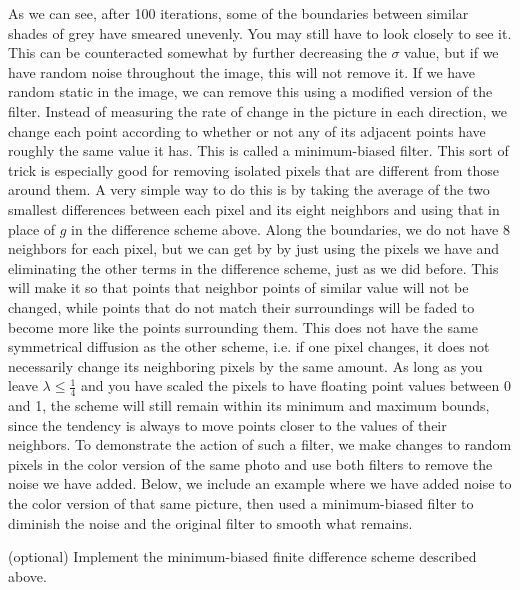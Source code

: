 As we can see, after 100 iterations, some of the boundaries between similar shades of grey have smeared unevenly. You may still have to look closely to see it.
This can be counteracted somewhat by further decreasing the $\sigma$ value, but if we have random noise throughout the image, this will not remove it.
If we have random static in the image, we can remove this using a modified version of the filter.
Instead of measuring the rate of change in the picture in each direction, we change each point according to whether or not any of its adjacent points have roughly the same value it has. 
This is called a minimum-biased filter. 
This sort of trick is especially good for removing isolated pixels that are different from those around them.
A very simple way to do this is by taking the average of the two smallest differences between each pixel and its eight neighbors and using that in place of $g$ in the difference scheme above.
Along the boundaries, we do not have 8 neighbors for each pixel, but we can get by by just using the pixels we have and eliminating the other terms in the difference scheme, just as we did before.
This will make it so that points that neighbor points of similar value will not be changed, while points that do not match their surroundings will be faded to become more like the points surrounding them.
This does not have the same symmetrical diffusion as the other scheme, i.e. if one pixel changes, it does not necessarily change its neighboring pixels by the same amount.
As long as you leave $\lambda \leq \frac{1}{4}$ and you have scaled the pixels to have floating point values between 0 and 1, the scheme will still remain within its minimum and maximum bounds, since the tendency is always to move points closer to the values of their neighbors.
To demonstrate the action of such a filter, we make changes to random pixels in the color version of the same photo and use both filters to remove the noise we have added.
Below, we include an example where we have added noise to the color version of that same picture, then used a minimum-biased filter to diminish the noise and the original filter to smooth what remains.

\begin{problem}
(optional)
Implement the minimum-biased finite difference scheme described above. 
\end{problem}

